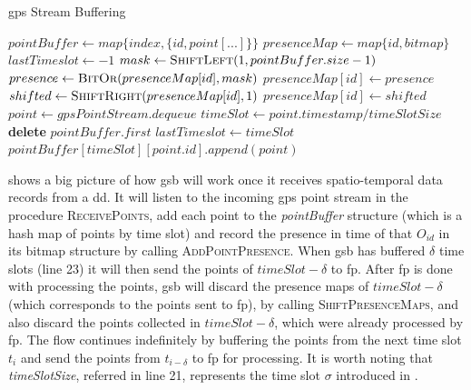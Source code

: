 \begin{algorithm}[h!]
\caption{\ac{gps} Stream Buffering}
\label{alg:gpsb}
\begin{algorithmic}[1]
    \State $pointBuffer \gets map\{index, \{id, point[...]\}\}$
    \State $presenceMap \gets map\{id, bitmap\}$
    \State $lastTimeslot \gets -1$
    \State
        \State $mask \gets \Call{ShiftLeft}{1, pointBuffer.size - 1}$
        \State $presence \gets \Call{BitOr}{presenceMap[id], mask}$
        \State $presenceMap[id] \gets presence$
    \EndProcedure
    \State
            \State $shifted \gets \Call{ShiftRight}{presenceMap[id], 1}$
            \State $presenceMap[id] \gets shifted$
        \EndFor
    \EndProcedure
    \State
        \Loop
            \State $point \gets gpsPointStream.dequeue$
            \State $timeSlot \gets point.timestamp / timeSlotSize$
                    \State {}
                    \State \textbf{delete} $pointBuffer.first$
                    \State {}
                \EndIf
                \State $lastTimeslot \gets timeSlot$
            \EndIf
            \State $pointBuffer[timeSlot][point.id].append(point)$
            \State {}
        \EndLoop
    \EndProcedure
\end{algorithmic}
\end{algorithm}

 shows a big picture of how \ac{gsb} will work once it receives spatio-temporal data records from a
\ac{dd}. It will listen to the incoming \ac{gps} point stream in the procedure \textsc{ReceivePoints}, add each point to
the \textit{pointBuffer} structure (which is a hash map of points by time slot) and record the presence in time of that
$O_{id}$ in its bitmap structure by calling \textsc{AddPointPresence}. When \ac{gsb} has buffered $\delta$ time slots
(line 23) it will then send the points of $timeSlot - \delta$ to \ac{fp}. After \ac{fp} is done with processing the
points, \ac{gsb} will discard the presence maps of $timeSlot - \delta$ (which corresponds to the points sent to
\ac{fp}), by calling \textsc{ShiftPresenceMaps}, and also discard the points collected in $timeSlot - \delta$, which
were already processed by \ac{fp}. The flow continues indefinitely by buffering the points from the next time slot $t_i$
and send the points from $t_{i - \delta}$ to \ac{fp} for processing. It is worth noting that \textit{timeSlotSize},
referred in line 21, represents the time slot $\sigma$ introduced in .

